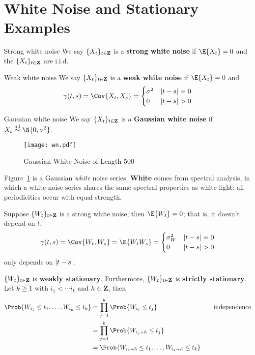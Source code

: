 \section{White Noise and Stationary Examples}
\begin{Definition}{Strong white noise}{}
    We say $ \{X_t\}_{t\in\mathbf{Z}} $ is a
    \textbf{strong white noise} if $ \E{X_t}=0 $
    and the $ \{X_t\}_{t\in\mathbf{Z}} $ are i.i.d.
\end{Definition}
\begin{Definition}{Weak white noise}{}
    We say $ \{X_t\}_{t\in\mathbf{Z}} $ is a
    \textbf{weak white noise} if $ \E{X_t}=0 $
    and
    \[ \gamma(t,s)=\Cov{X_t,X_s}=\begin{cases}
            \sigma^2 & \abs{t-s}=0 \\
            0        & \abs{t-s}>0
        \end{cases} \]
\end{Definition}
\begin{Definition}{Gaussian white noise}{}
    We say $ \{X_t\}_{t\in\mathbf{Z}} $ is a
    \textbf{Gaussian white noise}
    if $ X_t\stackrel{\text{iid}}{\sim}\N{0,\sigma^2} $.
\end{Definition}
\begin{figure}[!ht]
    \centering
    \texttt{[image: wn.pdf]}
    \caption{Gaussian White Noise of Length 500}\label{fig:wn}
\end{figure}
Figure~\ref{fig:wn} is a Gaussian \emph{white} noise series.
\textbf{White} comes from spectral analysis,
in which a white noise series shares the same spectral properties as white light:
all periodicities occur with equal strength.
\begin{Example}{}{}
    Suppose $ \{W_t\}_{t\in\mathbf{Z}} $
    is a strong white noise, then $ \E{W_t}=0 $;
    that is, it doesn't depend on $ t $.
    \[ \gamma(t,s)=\Cov{W_t,W_s}=\E{W_t W_s}=
        \begin{cases}
            \sigma_W^2 & \abs{t-s}=0 \\
            0          & \abs{t-s}>0
        \end{cases} \]
    only depends on $ \lvert t-s\rvert $.

    $ \{W_t\}_{t\in\mathbf{Z}} $ is
    \textbf{weakly stationary}. Furthermore,
    $ \{W_t\}_{t\in\mathbf{Z}} $ is
    \textbf{strictly stationary}. Let $ k\ge 1 $
    with $ i_1<\cdots i_k $ and $ h\in\mathbf{Z} $, then
    \begin{align*}
        \Prob{W_{i_1}\le t_1,\ldots,W_{i_k}\le t_k}
         & =\prod_{j=1}^k\Prob{W_{i_j}\le t_j}                   & \quad & \text{independence} \\
         & =\prod_{j=1}^k\Prob{W_{{i_j}+h}\le t_j}                                             \\
         & =\Prob{W_{{i_1}+h}\le t_1,\ldots, W_{{i_k}+h}\le t_k}
    \end{align*}
\end{Example}
